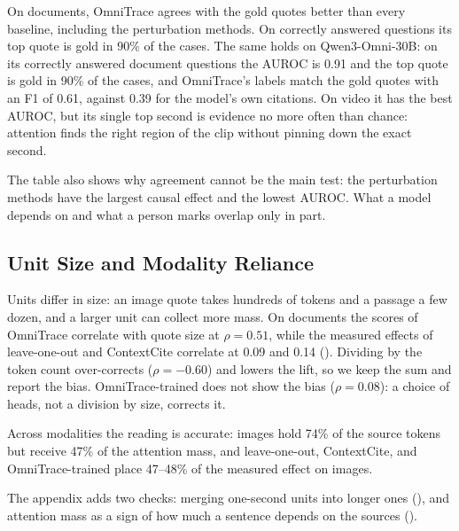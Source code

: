 On documents, OmniTrace agrees with the gold quotes better than every baseline, including the perturbation methods. On correctly answered questions its top quote is gold in 90\% of the cases.
The same holds on Qwen3-Omni-30B: on its correctly answered document questions the AUROC is 0.91 and the top quote is gold in 90\% of the cases, and OmniTrace's labels match the gold quotes with an F1 of 0.61, against 0.39 for the model's own citations.
On video it has the best AUROC, but its single top second is evidence no more often than chance: attention finds the right region of the clip without pinning down the exact second.

The table also shows why agreement cannot be the main test: the perturbation methods have the largest causal effect and the lowest AUROC. What a model depends on and what a person marks overlap only in part.

\subsection{Unit Size and Modality Reliance}
\label{sec:size}

Units differ in size: an image quote takes hundreds of tokens and a passage a few dozen, and a larger unit can collect more mass.
On documents the scores of OmniTrace correlate with quote size at $\rho=0.51$, while the measured effects of leave-one-out and ContextCite correlate at 0.09 and 0.14 ().
Dividing by the token count over-corrects ($\rho=-0.60$) and lowers the lift, so we keep the sum and report the bias.
OmniTrace-trained does not show the bias ($\rho=0.08$): a choice of heads, not a division by size, corrects it.

Across modalities the reading is accurate: images hold 74\% of the source tokens but receive 47\% of the attention mass, and leave-one-out, ContextCite, and OmniTrace-trained place 47--48\% of the measured effect on images.

The appendix adds two checks: merging one-second units into longer ones (), and attention mass as a sign of how much a sentence depends on the sources ().

